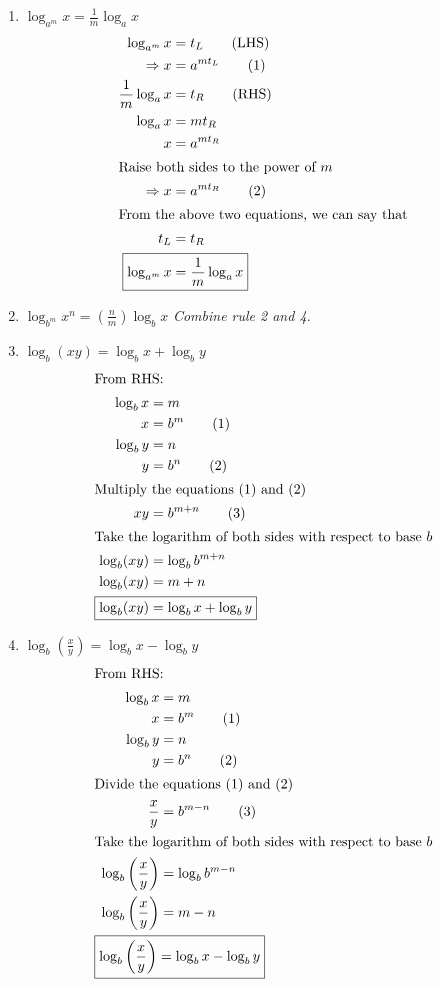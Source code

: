 \begin{enumerate}
    \item $\log_{a^m} x = \frac{1}{m} \log_a x$
        \begin{align*}
            \log_{a^m} x &= t_L \tag{LHS}\\
            \Rightarrow x &= a^{mt_L} \tag{1}\\
            \frac{1}{m}\log_a x &= t_R \tag{RHS}\\
            \log_a x &= mt_R\\
            x &= a^{mt_R}\\
            \intertext{Raise both sides to the power of \( m \)}
            \Rightarrow x &= a^{mt_R} \tag{2}\\
            \intertext{From the above two equations, we can say that}
            t_L &= t_R\\
            \Aboxed{\log_{a^m} x &= \frac{1}{m} \log_a x}
        \end{align*}

    \item $\log_{b^m} x^n = \left(\frac{n}{m}\right)\log_b x$ \hfill \textit{Combine rule 2 and 4.}

    \item $\log_b (xy) = \log_b x + \log_b y$
        \begin{align*}
            \intertext{From RHS:}
            \log_b x &= m \\ 
            x &= b^m \tag{1}\\
            \log_b y &= n\\
            y &= b^n \tag{2}\\
            \intertext{Multiply the equations (1) and (2)} 
            xy &= b^{m+n} \tag{3}\\
            \intertext{Take the logarithm of both sides with respect to base \( b \)}
            \log_b(xy) &= \log_b b^{m+n}\\
            \log_b(xy) &= m+n\\
            \Aboxed{\log_b(xy) &= \log_b x + \log_b y}
        \end{align*}

    \item $\log_b \left(\frac{x}{y}\right) = \log_b x - \log_b y$
        \begin{align*}
            \intertext{From RHS:}
            \log_b x &= m \\ 
            x &= b^m \tag{1}\\
            \log_b y &= n\\
            y &= b^n \tag{2}\\
            \intertext{Divide the equations (1) and (2)} 
            \frac{x}{y} &= b^{m-n} \tag{3}\\
            \intertext{Take the logarithm of both sides with respect to base \( b \)}
            \log_b\left(\frac{x}{y}\right) &= \log_b b^{m-n}\\
            \log_b\left(\frac{x}{y}\right) &= m-n\\
            \Aboxed{\log_b\left(\frac{x}{y}\right) &= \log_b x - \log_b y}
        \end{align*}


\end{enumerate}
